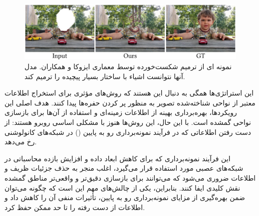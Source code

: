 \begin{figure}
	\centering
	\includegraphics[width=1\linewidth]{IISUKfail}
	\caption{نمونه ای از ترمیم شکست‌خورده توسط معماری ایزوکا و همکاران. مدل آنها نتوانست اشیاء با ساختار بسیار پیچیده را ترمیم کند.}
	\label{fig:iisukfail}
\end{figure}


\warningToSelfExpandable

این استراتژی‌ها همگی به دنبال این هستند که روش‌های مؤثری برای استخراج اطلاعات معتبر از نواحی شناخته‌شده تصویر به منظور پر کردن حفره‌ها پیدا کنند. هدف اصلی این رویکردها، بهره‌برداری بهینه از اطلاعات زمینه‌ای و استفاده از آن‌ها برای بازسازی نواحی گمشده است. با این حال، این روش‌ها هنوز با مشکلی اساسی روبرو هستند: از دست رفتن اطلاعاتی که در فرآیند نمونه‌برداری رو به پایین () در شبکه‌های کانولوشنی رخ می‌دهد.  

این فرآیند نمونه‌برداری که برای کاهش ابعاد داده و افزایش بازده محاسباتی در شبکه‌های عصبی مورد استفاده قرار می‌گیرد، اغلب منجر به حذف جزئیات ظریف و اطلاعات ضروری می‌شود که می‌توانند برای بازسازی دقیق‌تر و واقعی‌تر مناطق گمشده نقش کلیدی ایفا کنند. بنابراین، یکی از چالش‌های مهم این است که چگونه می‌توان ضمن بهره‌گیری از مزایای نمونه‌برداری رو به پایین، تأثیرات منفی آن را کاهش داد و اطلاعات از دست رفته را تا حد ممکن حفظ کرد.






